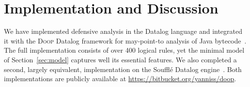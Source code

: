 




\section{Implementation and Discussion}
\label{sec:discussion}

We have implemented defensive analysis in the Datalog language and
integrated it with the \textsc{Doop} Datalog framework for
may-point-to analysis of Java bytecode~\cite{oopsla/BravenboerS09}.
The full implementation consists of over 400 logical rules, yet
the minimal model of Section~\ref{sec:model} captures well its
essential features. We also completed a second, largely equivalent,
implementation on the Souffl\'{e} Datalog
engine~\cite{DBLP:conf/cc/ScholzJSW16}. Both implementations are
publicly available at {\small \url{https://bitbucket.org/yanniss/doop}}.

